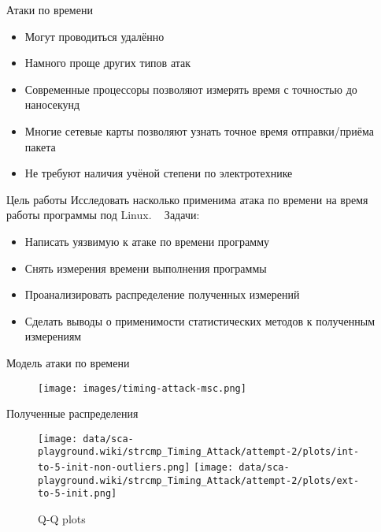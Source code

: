 \documentclass[14pt]{beamer}
\begin{document}
\begin{frame}{Атаки по времени}
    \begin{itemize}
        \item Могут проводиться удалённо
        \item Намного проще других типов атак
        \item Современные процессоры позволяют измерять время с точностью до наносекунд
        \item Многие сетевые карты позволяют узнать точное время отправки/приёма пакета
        \item Не требуют наличия учёной степени по электротехнике
    \end{itemize}
\end{frame}

\begin{frame}{Цель работы}
    Исследовать насколько применима атака по времени на время работы программы под Linux.
~
    Задачи:
    \begin{itemize}
        \item Написать уязвимую к атаке по времени программу
        \item Снять измерения времени выполнения программы
        \item Проанализировать распределение полученных измерений
        \item Сделать выводы о применимости статистических методов к полученным измерениям
    \end{itemize}
\end{frame}

\begin{frame}{Модель атаки по времени}
    \begin{figure}
        \centering
        \texttt{[image: images/timing-attack-msc.png]}
    \end{figure}
\end{frame}

\begin{frame}{Полученные распределения}
    \begin{figure}
        \centering
        \texttt{[image: data/sca-playground.wiki/strcmp\_Timing\_Attack/attempt-2/plots/int-to-5-init-non-outliers.png]}
        \texttt{[image: data/sca-playground.wiki/strcmp\_Timing\_Attack/attempt-2/plots/ext-to-5-init.png]}
        \caption{Q-Q plots}
    \end{figure}
\end{frame}
\end{document}
